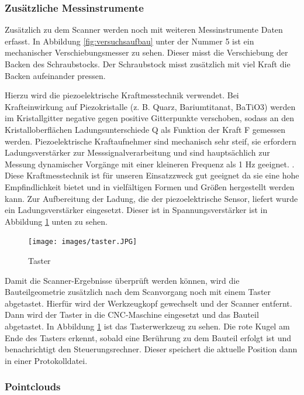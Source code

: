 \documentclass[../main.tex]{subfiles}
\begin{document}
\subsubsection{Zusätzliche Messinstrumente}

Zusätzlich zu dem Scanner werden noch mit weiteren Messinstrumente Daten erfasst.
In Abbildung \ref{fig:versuchsaufbau} unter der Nummer 5 ist ein mechanischer 
Verschiebungsmesser zu sehen. Dieser misst die Verschiebung der Backen des 
Schraubstocks. Der Schraubstock misst zusätzlich mit viel Kraft die Backen 
aufeinander pressen.

Hierzu wird die piezoelektrische Kraftmesstechnik verwendet.
Bei Krafteinwirkung auf Piezokristalle (z. B. Quarz, Bariumtitanat, BaTiO3) 
werden im Kristallgitter negative gegen positive Gitterpunkte
verschoben, sodass an den Kristalloberflächen
Ladungsunterschiede Q als Funktion der Kraft F
gemessen werden.
Piezoelektrische Kraftaufnehmer sind mechanisch sehr steif, 
sie erfordern Ladungsverstärker
zur Messsignalverarbeitung und sind hauptsächlich zur Messung dynamischer Vorgänge
mit einer kleineren Frequenz als 1 Hz geeignet. \cite{Czichos.2020}. 
Diese Kraftmesstechnik ist 
für unseren Einsatzzweck gut geeignet da sie eine hohe Empfindlichkeit bietet 
und in vielfältigen Formen und Größen hergestellt werden kann. Zur Aufbereitung 
der Ladung, die der piezoelektrische Sensor, liefert wurde ein Ladungsverstärker 
eingesetzt.\cite{Schwartz.2006}
Dieser ist in Spannungsverstärker ist in Abbildung \ref{fig:taster} unten zu sehen.

\newpage

\begin{figure}
    \texttt{[image: images/taster.JPG]}
    \caption{Taster}
    \label{fig:taster}
\end{figure}


Damit die Scanner-Ergebnisse überprüft werden können,
wird die Bauteilgeometrie zusätzlich nach dem Scanvorgang noch mit einem Taster
abgetastet. Hierfür wird der Werkzeugkopf gewechselt und der Scanner entfernt.
Dann wird der Taster in die CNC-Maschine eingesetzt und das Bauteil abgetastet.
In Abbildung \ref{fig:taster} ist das Tasterwerkzeug zu sehen. Die rote Kugel 
am Ende des Tasters erkennt, sobald eine Berührung zu dem Bauteil erfolgt ist 
und benachrichtigt den Steuerungsrechner. Dieser speichert die aktuelle Position 
dann in einer Protokolldatei.

\subsubsection{Pointclouds}
\end{document}
